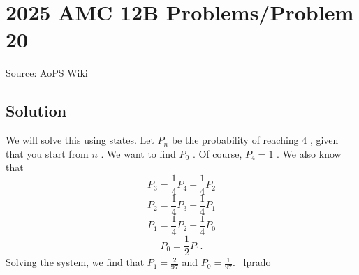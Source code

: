 \documentclass[12pt]{article}
\begin{document}
\section*{{2025 AMC 12B Problems/Problem 20}}
Source: AoPS Wiki

\subsection*{Solution}
We will solve this using states. Let $P_n$ be the probability of reaching $4$ , given that you start from $n$ . We want to find $P_0$ . Of course, $P_4 = 1$ . We also know that \[P_3 = \frac{1}{4}P_4 + \frac{1}{4}P_2\] \[P_2 = \frac{1}{4}P_3 + \frac{1}{4}P_1\] \[P_1 = \frac{1}{4}P_2 + \frac{1}{4}P_0\] \[P_0 = \frac{1}{2}P_1.\] Solving the system, we find that $P_1 = \frac{2}{97}$ and $P_0 = \boxed{\frac{1}{97}}.$ ~lprado
\end{document}
